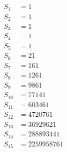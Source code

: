 \begin{align*}
S_{1} &= 1\\
S_{2} &= 1\\
S_{3} &= 1\\
S_{4} &= 1\\
S_{5} &= 1\\
S_{6} &= 21\\
S_{7} &= 161\\
S_{8} &= 1261\\
S_{9} &= 9861\\
S_{10} &= 77141\\
S_{11} &= 603461\\
S_{12} &= 4720761\\
S_{13} &= 36929621\\
S_{14} &= 288893441\\
S_{15} &= 2259958761\\
\end{align*}	
